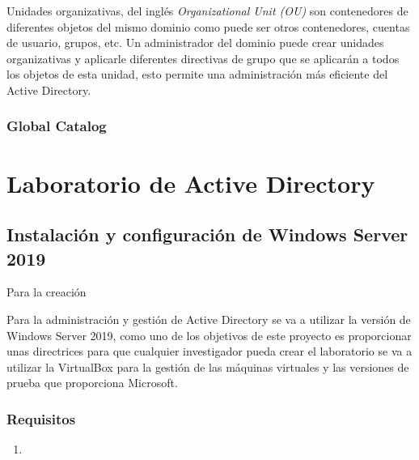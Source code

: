 Unidades organizativas, del inglés {\it Organizational Unit (OU)} son contenedores de diferentes objetos del mismo dominio como puede ser otros contenedores, cuentas de usuario, grupos, etc. Un administrador del dominio puede crear unidades organizativas y aplicarle diferentes directivas de grupo que se aplicarán a todos los objetos de esta unidad, esto permite una administración más eficiente del Active Directory. 

\subsubsection{Global Catalog}


\section{Laboratorio de Active Directory}



\subsection{Instalación y configuración de Windows Server 2019}

Para la creación 


Para la administración y gestión de Active Directory se va a utilizar la versión de Windows Server 2019, como uno de los objetivos de este proyecto es proporcionar unas directrices para que cualquier investigador pueda crear el laboratorio se va a utilizar la VirtualBox para la gestión de las máquinas virtuales y las versiones de prueba que proporciona Microsoft. 

\subsubsection{Requisitos}





\begin{enumerate}
\item 
\end{enumerate}


